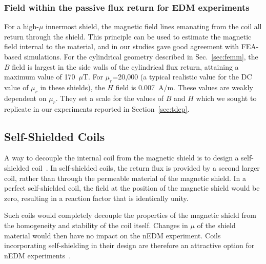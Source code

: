 \subsubsection{Field within the passive flux return for EDM experiments}

For a high-$\mu$ innermost shield, the magnetic field lines emanating
from the coil all return through the shield.  This principle can be
used to estimate the magnetic field internal to the material, and in
our studies gave good agreement with FEA-based simulations.  For the
cylindrical geometry described in Sec.~\ref{sec:femm}, the $B$ field
is largest in the side walls of the cylindrical flux return, attaining
a maximum value of 170~$\mu$T.  For $\mu_r$=20,000 (a typical
realistic value for the DC value of $\mu_r$ in these shields), the $H$
field is 0.007~A/m.  These values are weakly dependent on $\mu_r$.
They set a scale for the values of $B$ and $H$ which we sought to
replicate in our experiments reported in Section~\ref{sec:tdep}.



\subsection{Self-Shielded Coils}

A way to decouple the internal coil from the magnetic shield is to
design a self-shielded
coil~\cite{bib:cpviolwithoutstrangeness,bib:someotherselfshieldedcoilpapers}.
In self-shielded coils, the return flux is provided by a second larger
coil, rather than through the permeable material of the magnetic
shield.  In a perfect self-shielded coil, the field at the position of
the magnetic shield would be zero, resulting in a reaction factor that
is identically unity.

Such coils would completely decouple the properties of the magnetic
shield from the homogeneity and stability of the coil itself.  Changes
in $\mu$ of the shield material would then have no impact on the nEDM
experiment.  Coils incorporating self-shielding in their design are
therefore an attractive option for nEDM
experiments~\cite{bib:cpviolwithoutstrangeness}.



